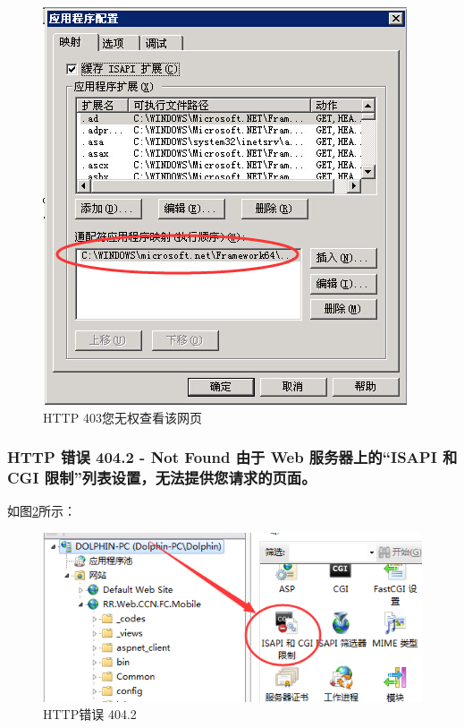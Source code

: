 \documentclass{book}
\begin{document}
\begin{figure}[htbp]
	\centering
	\includegraphics[scale=0.8]{HTTP403ErrorSolution.jpg}
	\caption{HTTP 403您无权查看该网页}
	\label{fig:HTTP403ErrorSolution}
\end{figure}

\subsubsection{HTTP 错误 404.2 - Not Found 由于 Web 服务器上的“ISAPI 和 CGI 限制”列表设置，无法提供您请求的页面。}

如图\ref{fig:ISAPIAndCGI}所示：

\begin{figure}[htbp]
	\centering
	\includegraphics[scale=0.8]{ISAPIAndCGI.png}
	\caption{HTTP错误 404.2}
	\label{fig:ISAPIAndCGI}
\end{figure}
\end{document}
